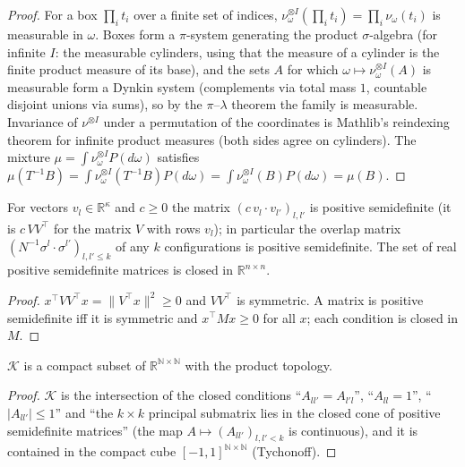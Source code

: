 \begin{proof}
  \leanok
For a box $\prod_it_i$ over a finite set of indices, $\nu_\omega^{\otimes I}(\prod_it_i)=\prod_i\nu_\omega(t_i)$ is measurable in $\omega$. Boxes form a $\pi$-system generating the product
$\sigma$-algebra (for infinite $I$: the measurable cylinders, using that the measure of a cylinder is the finite product measure of its base), and the sets $A$ for which $\omega\mapsto\nu_\omega^{\otimes I}(A)$ is measurable form a Dynkin system
(complements via total mass $1$, countable disjoint unions via sums), so by the $\pi$--$\lambda$ theorem the family is measurable. Invariance of $\nu^{\otimes I}$ under a permutation of the coordinates is Mathlib's
reindexing theorem for infinite product measures (both sides agree on cylinders). The mixture $\mu=\int\nu_\omega^{\otimes I}P(d\omega)$ satisfies $\mu(T^{-1}B)=\int\nu_\omega^{\otimes I}(T^{-1}B)P(d\omega)=\int\nu_\omega^{\otimes I}(B)P(d\omega)=\mu(B)$.
\end{proof}

\begin{lemma}\label{lem:sg:gram-psd}
  \leanok
For vectors $v_l\in\mathbb R^\kappa$ and $c\ge0$ the matrix $(c\,v_l\cdot v_{l'})_{l,l'}$ is positive semidefinite (it is $c\,VV^\top$ for the matrix $V$ with rows $v_l$); in particular the overlap matrix
$(N^{-1}\sigma^l\cdot\sigma^{l'})_{l,l'\le k}$ of any $k$ configurations is positive semidefinite. The set of real positive semidefinite matrices is closed in $\mathbb R^{n\times n}$.
\end{lemma}

\begin{proof}
  \leanok
$x^\top VV^\top x=\|V^\top x\|^2\ge0$ and $VV^\top$ is symmetric. A matrix is positive semidefinite iff it is symmetric and $x^\top Mx\ge0$ for all $x$; each condition is closed in $M$.
\end{proof}

\begin{lemma}\label{lem:sg:gram-compact}
  \leanok
$\mathcal K$ is a compact subset of $\mathbb R^{\mathbb N\times\mathbb N}$ with the product topology.
\end{lemma}

\begin{proof}
  \leanok
$\mathcal K$ is the intersection of the closed conditions ``$A_{ll'}=A_{l'l}$'', ``$A_{ll}=1$'', ``$|A_{ll'}|\le1$'' and ``the $k\times k$ principal submatrix lies in the closed cone of positive semidefinite matrices'' (the map $A\mapsto(A_{ll'})_{l,l'<k}$ is continuous), and it is contained in
the compact cube $[-1,1]^{\mathbb N\times\mathbb N}$ (Tychonoff).
\end{proof}

